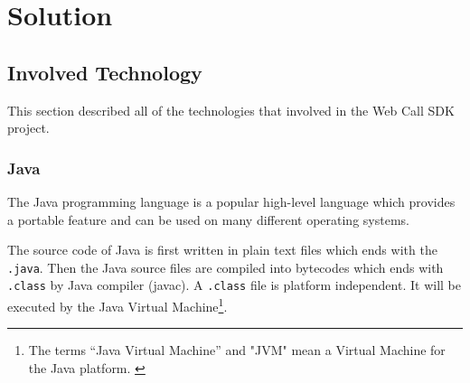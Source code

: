 \chapter{Solution}
\label{sec:Solution}

\section{Involved Technology}
\label{sec:Solution:InvolvedTechnology}

This section described all of the technologies that involved in the Web Call SDK project.

\subsection{Java}
\label{sec:Solution:InvolvedTechnology:Java}

The Java\texttrademark{} programming language is a popular high-level language which provides a portable feature and can be used on many different operating systems. 

The source code of Java is first written in plain text files which ends with the \nolinebreak\texttt{.java}. Then the Java source files are compiled into bytecodes which ends with \nolinebreak\texttt{.class} by Java compiler (javac). A \nolinebreak\texttt{.class} file is platform independent. It will be executed by the Java Virtual Machine\label{sym:JVM}\footnote{The terms ``Java Virtual Machine'' and "JVM" mean a Virtual Machine for the Java platform. \cite{TheJavaProgrammingLanguage}}.\cite{TheJavaProgrammingLanguage}




